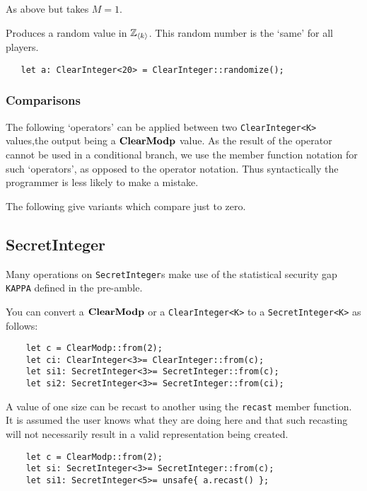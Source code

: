 As above but takes $M=1$.


Produces a random value in ${\mathbb{Z}}_{\langle k \rangle}$.
This random number is the `same' for all players.
\begin{lstlisting}
   let a: ClearInteger<20> = ClearInteger::randomize();
\end{lstlisting}

\subsubsection{Comparisons}
The following `operators' can be applied between two \verb|ClearInteger<K>|
values,the output being a $\mathbf{ClearModp}$ value.
As the result of the operator cannot be used in a conditional branch,
we use the member function notation for such `operators', as opposed
to the operator notation. Thus syntactically the programmer is less
likely to make a mistake.

\noindent
The following give variants which compare just to zero.




\subsection{SecretInteger}
Many operations on \verb|SecretInteger|s make use of the statistical
security gap \verb|KAPPA| defined in the pre-amble.

You can convert a $\mathbf{ClearModp}$ or a \verb|ClearInteger<K>| to a
\verb|SecretInteger<K>|
as follows:
\begin{lstlisting}
    let c = ClearModp::from(2);
    let ci: ClearInteger<3>= ClearInteger::from(c);
    let si1: SecretInteger<3>= SecretInteger::from(c);
    let si2: SecretInteger<3>= SecretInteger::from(ci);
\end{lstlisting}

A value of one size can be recast to another using the \verb|recast|
member function. It is assumed the user knows what they are doing here
and that such recasting will not necessarily result in a valid representation
being created.
\begin{lstlisting}
    let c = ClearModp::from(2);
    let si: SecretInteger<3>= SecretInteger::from(c);
    let si1: SecretInteger<5>= unsafe{ a.recast() };
\end{lstlisting}

